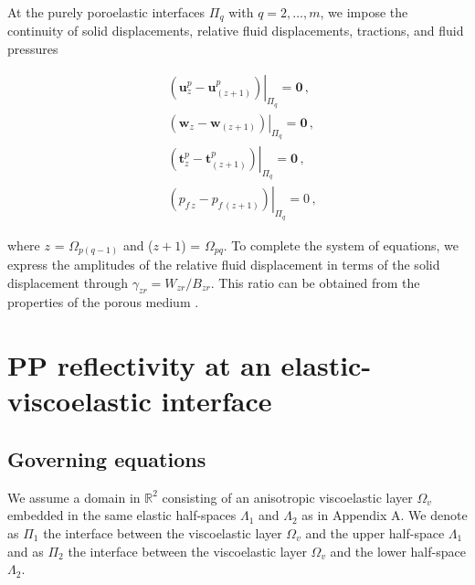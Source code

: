 \documentclass[draft]{agujournal2019}
\begin{document}
At the purely poroelastic interfaces $\Pi_q$ with $q=2,\dots,m$, we impose the continuity of solid displacements, relative fluid displacements, tractions, and fluid pressures \cite{Deresiewicz1963}
\begin{linenomath*}
\begin{equation}\label{Eq.19}
\begin{split}
&  \left. \left( \bm{u}_z^p -  \bm{u}_{(z+1)}^p \right) \right \rvert_{\Pi_q} = \bm{0} \,, \\
&  \left. \left(  \bm{w}_z -  \bm{w}_{(z+1)} \right) \right \rvert_{\Pi_q} = \bm{0} \,, \\
& \left . \left(  \bm{t}_z^p  - \bm{t}_{(z+1)}^p \right) \right \rvert_{\Pi_q}= \bm{0} \,,\\
&  \left. \left(  p_{f\,z} -  p_{f\, (z+1)} \right) \right \rvert_{\Pi_q} = 0 \,,
\end{split}
\end{equation}
\end{linenomath*}
where $z$ = $\Omega_{p(q-1)}$ and ($z+1$) = $\Omega_{pq}$. 
To complete the system of equations, we express the amplitudes of the relative fluid displacement in terms of the solid displacement through
 $\gamma_{zr}=W_{zr}/B_{zr}$. This ratio can be  obtained from the properties of the porous medium \cite{Barbosa2016}.


\section{PP reflectivity at an elastic-viscoelastic interface}
\subsection{Governing equations}
We assume a  domain in $\mathbb R^2$ consisting of an anisotropic viscoelastic layer $\Omega_v$  
embedded in the same elastic half-spaces $\Lambda_1$ and $\Lambda_2$ as in Appendix A. We denote as $\Pi_1$ the interface between the viscoelastic layer $\Omega_v$ and the upper half-space $\Lambda_1$ and as $\Pi_2$ the interface between the viscoelastic layer $\Omega_v$ and the lower half-space $\Lambda_2$.
 
\end{document}
